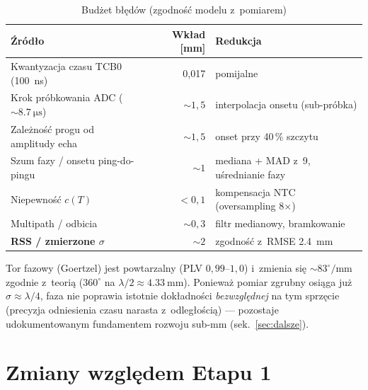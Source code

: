 \documentclass[a4paper,11pt]{article}
\begin{document}
\begin{table}[H]
	\centering
	\caption{Budżet błędów (zgodność modelu z~pomiarem)}
	\label{tab:budzet}
	\begin{tabularx}{\textwidth}{Xrl}
		\toprule
		\textbf{Źródło} & \textbf{Wkład [mm]} & \textbf{Redukcja} \\
		\midrule
		Kwantyzacja czasu TCB0 (\SI{100}{\nano\second}) & 0{,}017 & pomijalne \\
		Krok próbkowania ADC (${\sim}\SI{8,7}{\micro\second}$) & ${\sim}1{,}5$ & interpolacja onsetu (sub-próbka) \\
		Zależność progu od amplitudy echa & ${\sim}1{,}5$ & onset przy 40\,\% szczytu \\
		Szum fazy / onsetu ping-do-pingu & ${\sim}1$ & mediana + MAD z~9, uśrednianie fazy \\
		Niepewność $c(T)$ & ${<}0{,}1$ & kompensacja NTC (oversampling 8$\times$) \\
		Multipath / odbicia & ${\sim}0{,}3$ & filtr medianowy, bramkowanie \\
		\midrule
		\textbf{RSS / zmierzone $\sigma$} & \textbf{${\sim}2$} & zgodność z~RMSE \SI{2,4}{\milli\metre} \\
		\bottomrule
	\end{tabularx}
\end{table}

Tor fazowy (Goertzel) jest powtarzalny (PLV $0{,}99$--$1{,}0$) i~zmienia się
${\sim}83^\circ/\si{\milli\metre}$ zgodnie z~teorią ($360^\circ$ na
$\lambda/2\approx\SI{4,33}{\milli\metre}$). Ponieważ pomiar zgrubny osiąga już
$\sigma\approx\lambda/4$, faza nie poprawia istotnie dokładności
\emph{bezwzględnej} na tym sprzęcie (precyzja odniesienia czasu narasta
z~odległością) --- pozostaje udokumentowanym fundamentem rozwoju sub-mm
(sek.~\ref{sec:dalsze}).

\section{Zmiany względem Etapu 1}
\label{sec:zmiany}
\end{document}

